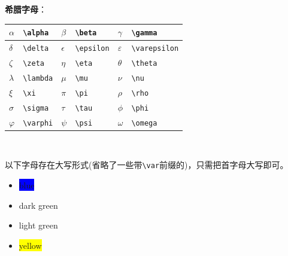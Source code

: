 \documentclass[12pt, a4paper, oneside]{ctexart}
\begin{document}
 


\begin{table}[!htbp]
    \textbf{希腊字母}：
    \vspace{2mm} \\
    \centering
\begin{tabular}{|l|l|l|l|l|l|}
        \hline
    $ \alpha $ & \verb|\alpha|  & $ \beta $    & \verb|\beta|    & $ \gamma $      & \verb|\gamma|      \\ \hline
    $ \delta $ & \verb|\delta|  & $ \epsilon $ & \verb|\epsilon| & $ \varepsilon $ & \verb|\varepsilon| \\ \hline
    $ \zeta  $ & \verb|\zeta|   & $ \eta $     & \verb|\eta|     & $ \theta $      & \verb|\theta|      \\ \hline
    $ \lambda$ & \verb|\lambda| & $ \mu  $     & \verb|\mu|      & $ \nu $         & \verb|\nu|         \\ \hline
    $ \xi    $ & \verb|\xi|     & $ \pi $      & \verb|\pi|      & $ \rho $        & \verb|\rho|        \\ \hline
    $ \sigma $ & \verb|\sigma|  & $ \tau $     & \verb|\tau|     & $ \phi $        & \verb|\phi|        \\ \hline
    $ \varphi$ & \verb|\varphi| & $ \psi $     & \verb|\psi|     & $ \omega $      & \verb|\omega|      \\ \hline
\end{tabular}
\vspace{2mm}  \\
\end{table}

以下字母存在大写形式(省略了一些带\verb|\var|前缀的)，只需把首字母大写即可。




\begin{itemize}
    \item \colorbox{blue}{blue}
    \item \colorbox{dark_green}{dark green}
    \item \colorbox{light_green}{light green}
    \item \colorbox{yellow}{yellow}
\end{itemize}
\end{document}
